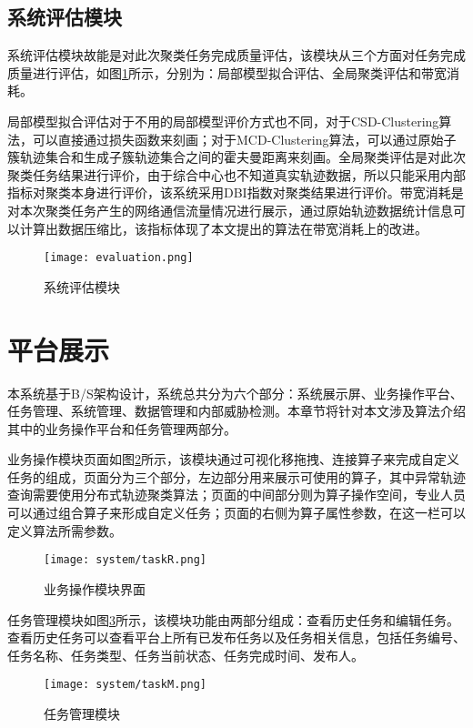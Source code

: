 \subsection{系统评估模块}

系统评估模块故能是对此次聚类任务完成质量评估，该模块从三个方面对任务完成质量进行评估，如图\ref{evaluation}所示，分别为：局部模型拟合评估、全局聚类评估和带宽消耗。

局部模型拟合评估对于不用的局部模型评价方式也不同，对于CSD-Clustering算法，可以直接通过损失函数来刻画；对于MCD-Clustering算法，可以通过原始子簇轨迹集合和生成子簇轨迹集合之间的霍夫曼距离来刻画。全局聚类评估是对此次聚类任务结果进行评价，由于综合中心也不知道真实轨迹数据，所以只能采用内部指标对聚类本身进行评价，该系统采用DBI指数对聚类结果进行评价。带宽消耗是对本次聚类任务产生的网络通信流量情况进行展示，通过原始轨迹数据统计信息可以计算出数据压缩比，该指标体现了本文提出的算法在带宽消耗上的改进。
\begin{figure}[H]
	\texttt{[image: evaluation.png]}
	\caption{系统评估模块}
	\label{evaluation}
\end{figure}


\section{平台展示}

本系统基于B/S架构设计，系统总共分为六个部分：系统展示屏、业务操作平台、任务管理、系统管理、数据管理和内部威胁检测。本章节将针对本文涉及算法介绍其中的业务操作平台和任务管理两部分。

业务操作模块页面如图\ref{taskRelease3}所示，该模块通过可视化移拖拽、连接算子来完成自定义任务的组成，页面分为三个部分，左边部分用来展示可使用的算子，其中异常轨迹查询需要使用分布式轨迹聚类算法；页面的中间部分则为算子操作空间，专业人员可以通过组合算子来形成自定义任务；页面的右侧为算子属性参数，在这一栏可以定义算法所需参数。
\begin{figure}[H]
	\texttt{[image: system/taskR.png]}
	\caption{业务操作模块界面}
	\label{taskRelease3}
\end{figure}

任务管理模块如图\ref{taskManage}所示，该模块功能由两部分组成：查看历史任务和编辑任务。查看历史任务可以查看平台上所有已发布任务以及任务相关信息，包括任务编号、任务名称、任务类型、任务当前状态、任务完成时间、发布人。
\begin{figure}[H]
	\texttt{[image: system/taskM.png]}
	\caption{任务管理模块}
	\label{taskManage}
\end{figure}


